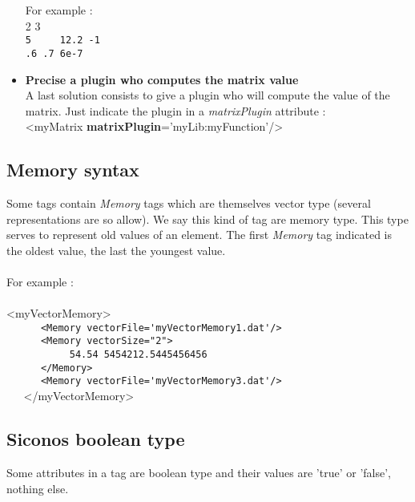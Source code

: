 \begin{itemize}
For example : \\

2 3\\
\verb+5  	12.2 -1+\\
\verb+.6 .7 6e-7 +\\


\item \textbf{Precise a plugin who computes the matrix value}\\

A last solution consists to give a plugin who will compute the value of the matrix. Just indicate the plugin in a \textit{matrixPlugin} attribute : \\

<myMatrix \textbf{matrixPlugin}='myLib:myFunction'/>\\


\end{itemize}

\subsection{Memory syntax}

Some tags contain \textit{Memory} tags which are themselves vector type (several representations are so allow). We say this kind of tag are memory type.
This type serves to represent old values of an element.
The first \textit{Memory} tag indicated is the oldest value, the last the youngest value.\\\\

For example : \\\\

<myVectorMemory>\\
\verb+      <Memory vectorFile='myVectorMemory1.dat'/>+\\
\verb+      <Memory vectorSize="2">+\\
\verb+           54.54 5454212.5445456456+\\
\verb+      </Memory>+\\
\verb+      <Memory vectorFile='myVectorMemory3.dat'/>+\\		
\verb+   +</myVectorMemory>

\subsection{Siconos boolean type}

Some attributes in a tag are boolean type and their values are 'true' or 'false', nothing else.





